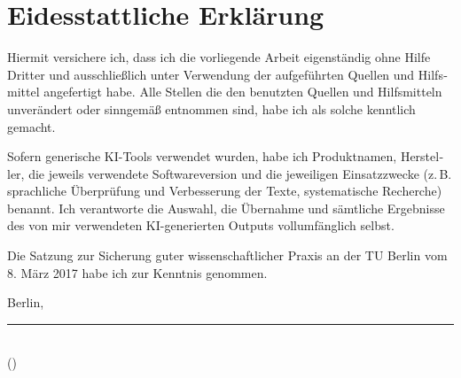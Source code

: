 
\chapter*{Eidesstattliche Erklärung}
\thispagestyle{empty}

\begin{german}
Hiermit versichere ich, dass ich die vorliegende Arbeit eigenständig ohne Hilfe Dritter und ausschließlich unter Verwendung der aufgeführten Quellen und Hilfsmittel angefertigt habe. Alle Stellen die den benutzten Quellen und Hilfsmitteln unverändert oder sinngemäß entnommen sind, habe ich als solche kenntlich gemacht.

Sofern generische KI-Tools verwendet wurden, habe ich Produktnamen, Hersteller, die jeweils verwendete Softwareversion und die jeweiligen Einsatzzwecke (z.\,B. sprachliche Überprüfung und Verbesserung der Texte, systematische Recherche) benannt. Ich verantworte die Auswahl, die Übernahme und sämtliche Ergebnisse des von mir verwendeten KI-generierten Outputs vollumfänglich selbst.

Die Satzung zur Sicherung guter wissenschaftlicher Praxis an der TU Berlin vom 8. März 2017 habe ich zur Kenntnis genommen.

\vspace{5mm}
Berlin, \submissiondate

\vspace{20mm}
\rule{80mm}{0.4pt}\\
(\authorname)
\end{german}
